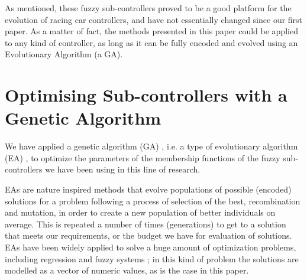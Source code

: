 \documentclass[10pt,journal,compsoc]{IEEEtran}
\begin{document}
As mentioned, these fuzzy sub-controllers proved to be a good platform for the evolution of racing car controllers, and have not essentially changed since our first paper. As a matter of fact, the methods presented in this paper could
be applied to any kind of controller, as long as it can be fully
encoded and evolved using an Evolutionary Algorithm (a GA).




\section{Optimising Sub-controllers with a Genetic Algorithm}
\label{sec:ga}




We have applied a genetic algorithm (GA) \cite{GAs_Goldberg89}, i.e. a type of evolutionary algorithm (EA) \cite{EAs_Back96}, to optimize the parameters of the membership functions of the fuzzy sub-controllers we have been using in this line of research. 

EAs are nature inspired methods that evolve populations of possible (encoded) solutions for a problem following a process of selection of the best,
recombination and mutation, in order to create a new population of
better individuals on average. This is repeated a number of times
(generations) to get to a solution that meets our requirements, or the
budget we have for evaluation of solutions. EAs have been widely
applied to solve a huge amount of optimization problems, including regression and fuzzy systems \cite{hoffmann2001evolutionary}; in this kind of problem the solutions are modelled as a vector of numeric values, as is the
case in this paper. 
\end{document}
